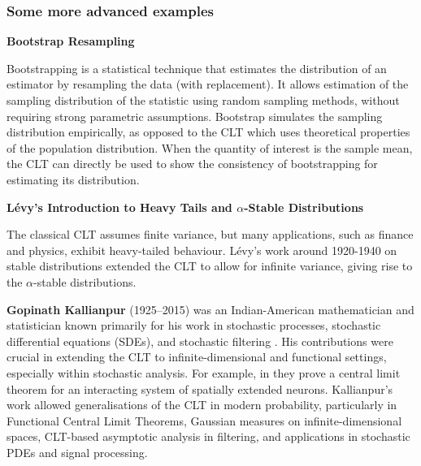 \subsubsection{Some more advanced examples}


\noindent \textbf{Bootstrap Resampling}
\vspace{0.3em}

Bootstrapping is a statistical technique that estimates the distribution of an estimator by resampling the data (with replacement). It allows estimation of the sampling distribution of the statistic using random sampling methods, without requiring strong parametric assumptions. Bootstrap simulates the sampling distribution empirically, as opposed to the CLT which uses theoretical properties of the population distribution.
%
When the quantity of interest is the sample mean, the CLT can directly be used to show the consistency of bootstrapping for estimating its distribution.

\vspace{0.3em}
\noindent \textbf{Lévy’s Introduction to Heavy Tails and $\alpha$-Stable Distributions}
\vspace{0.3em}

The classical CLT assumes finite variance, but many applications, such as finance and physics, exhibit heavy-tailed behaviour. L\'evy's work around 1920-1940 on stable distributions extended the CLT to allow for infinite variance, giving rise to the $\alpha$-stable distributions. 

\textbf{Gopinath Kallianpur} (1925–2015) was an Indian-American mathematician and statistician known primarily for his work in stochastic processes, stochastic differential equations (SDEs), and stochastic filtering  \citep{kallianpur2015obituary}. His contributions were crucial in extending the CLT to infinite-dimensional and functional settings, especially within stochastic analysis. For example, in \cite{kallianpur1992segal} they prove a central limit theorem for an interacting system of spatially extended neurons. Kallianpur's work allowed generalisations of the CLT in modern probability, particularly in Functional Central Limit Theorems, Gaussian measures on infinite-dimensional spaces, CLT-based asymptotic analysis in filtering, and applications in stochastic PDEs and signal processing.


